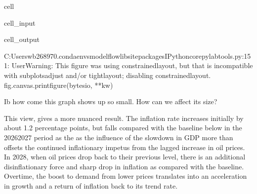 \documentclass[letterpaper,10pt,english]{jupyterBook}
\begin{document}
\begin{sphinxuseclass}{cell}\begin{sphinxVerbatimInput}

\begin{sphinxuseclass}{cell_input}
\begin{sphinxVerbatim}[commandchars=\\\{\}]
\PYG{p}{[}\PYG{p}{]}
\end{sphinxVerbatim}

\end{sphinxuseclass}\end{sphinxVerbatimInput}
\begin{sphinxVerbatimOutput}

\begin{sphinxuseclass}{cell_output}
\begin{sphinxVerbatim}[commandchars=\\\{\}]
C:\PYGZbs{}Users\PYGZbs{}wb268970\PYGZbs{}.conda\PYGZbs{}envs\PYGZbs{}modelflow\PYGZbs{}lib\PYGZbs{}site\PYGZhy{}packages\PYGZbs{}IPython\PYGZbs{}core\PYGZbs{}pylabtools.py:151: UserWarning: This figure was using constrained\PYGZus{}layout, but that is incompatible with subplots\PYGZus{}adjust and/or tight\PYGZus{}layout; disabling constrained\PYGZus{}layout.
  fig.canvas.print\PYGZus{}figure(bytes\PYGZus{}io, **kw)
\end{sphinxVerbatim}

\noindent{}

\end{sphinxuseclass}\end{sphinxVerbatimOutput}

\end{sphinxuseclass}
\sphinxAtStartPar
 Ib how come this graph shows up so small.  How can we affect its size?

\sphinxAtStartPar
This view, gives a more nuanced result.  The inflation rate increases initially by about 1.2 percentage points, but falls compared with the baseline below in the 2026\sphinxhyphen{}2027 period as the as the influence of the slowdown in GDP more than offsets the continued inflationary impetus from the lagged increase in oil prices. In 2028, when oil prices drop back to their previous level, there is an additional dis\sphinxhyphen{}inflationary force and sharp drop in inflation as compared with the baseline. Overtime, the boost to demand from lower prices translates into an acceleration in growth and a return of inflation back to its trend rate.
\end{document}
